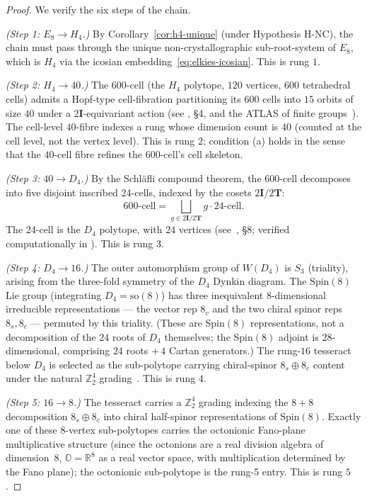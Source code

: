 \documentclass[12pt]{article}
\theoremstyle{definition}
\theoremstyle{remark}
\newcommand{\twoT}{2\mathbf{T}}
\newcommand{\twoI}{2\mathbf{I}}
\begin{document}
\begin{proof}
We verify the six steps of the chain.

\emph{(Step 1: $E_8 \to H_4$.)} By Corollary~\ref{cor:h4-unique} (under Hypothesis H-NC), the chain must pass through the unique non-crystallographic sub-root-system of $E_8$, which is $H_4$ via the icosian embedding~\eqref{eq:elkies-icosian}. This is rung $1$.

\emph{(Step 2: $H_4 \to 40$.)} The 600-cell (the $H_4$ polytope, $120$ vertices, $600$ tetrahedral cells) admits a Hopf-type cell-fibration partitioning its $600$ cells into $15$ orbits of size $40$ under a $\twoI$-equivariant action (see \citep{SmartXXXV}, \S4, and the ATLAS of finite groups~\citep{Conway1985Atlas}). The cell-level $40$-fibre indexes a rung whose dimension count is $40$ (counted at the cell level, not the vertex level). This is rung $2$; condition (a) holds in the sense that the $40$-cell fibre refines the 600-cell's cell skeleton.

\emph{(Step 3: $40 \to D_4$.)} By the Schl\"afli compound theorem, the 600-cell decomposes into five disjoint inscribed 24-cells, indexed by the cosets $\twoI / \twoT$:
\begin{equation}
\text{600-cell} = \bigsqcup_{g \in \twoI / \twoT} g \cdot \text{24-cell}.
\end{equation}
The 24-cell is the $D_4$ polytope, with $24$ vertices (see~\citep{Coxeter1973}, \S8; verified computationally in \citep{SmartXXXV}). This is rung $3$.

\emph{(Step 4: $D_4 \to 16$.)} The outer automorphism group of $W(D_4)$ is $S_3$ (triality), arising from the three-fold symmetry of the $D_4$ Dynkin diagram. The $\mathrm{Spin}(8)$ Lie group (integrating $D_4 = \mathrm{so}(8)$) has three inequivalent $8$-dimensional irreducible representations --- the vector rep $8_v$ and the two chiral spinor reps $8_s, 8_c$ --- permuted by this triality. (These are Spin$(8)$ representations, not a decomposition of the $24$ roots of $D_4$ themselves; the Spin$(8)$ adjoint is $28$-dimensional, comprising $24$ roots $+\,4$ Cartan generators.) The rung-$16$ tesseract below $D_4$ is selected as the sub-polytope carrying chiral-spinor $8_s \oplus 8_c$ content under the natural $\mathbb{Z}_2^4$ grading~\citep{SmartXXXV}. This is rung $4$.

\emph{(Step 5: $16 \to 8$.)} The tesseract carries a $\mathbb{Z}_2^4$ grading indexing the $8 + 8$ decomposition $8_s \oplus 8_c$ into chiral half-spinor representations of $\mathrm{Spin}(8)$. Exactly one of these $8$-vertex sub-polytopes carries the octonionic Fano-plane multiplicative structure (since the octonions are a real division algebra of dimension~$8$, $\mathbb{O} = \mathbb{R}^8$ as a real vector space, with multiplication determined by the Fano plane); the octonionic sub-polytope is the rung-5 entry. This is rung $5$.


\end{proof}
\end{document}
